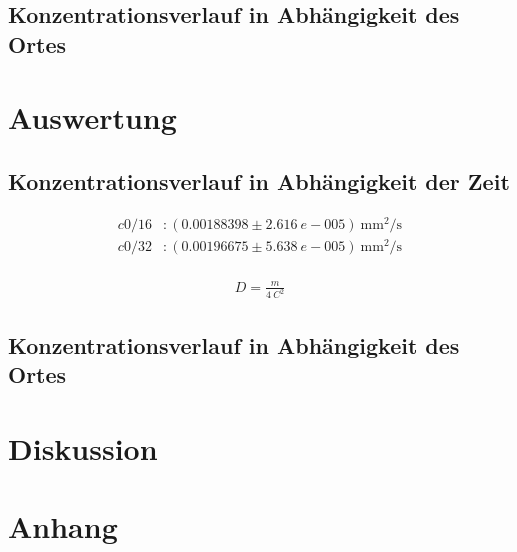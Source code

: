 \documentclass[12pt,a4paper,titlepage,headinclude,bibtotoc]{scrartcl}
\begin{document}
\subsection{Konzentrationsverlauf in Abhängigkeit des Ortes}

\section{Auswertung}
\label{sec:auswertung}
\subsection{Konzentrationsverlauf in Abhängigkeit der Zeit}


\begin{align*}
	c0/16&: (0.00188398 \pm 2.616~e-005)~\si{\milli \meter ^2 / \second}\\
	c0/32&: (0.00196675 \pm 5.638~e-005) ~\si{\milli \meter ^2 / \second}\\
\end{align*}

\begin{align}
	D=\frac{m}{4~C^2}	
\end{align}

\subsection{Konzentrationsverlauf in Abhängigkeit des Ortes}


\section{Diskussion}
\label{sec:diskussion}

\section{Anhang}

\begin{thebibliography}{100}

\end{thebibliography}
\end{document}
